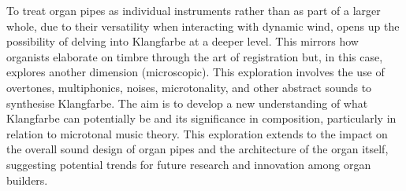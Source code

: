 \documentclass[11pt, oneside]{article}   	%
\begin{document}
To treat organ pipes as individual instruments rather than as part of a larger whole, due to their versatility when interacting with dynamic wind, opens up the possibility of delving into Klangfarbe at a deeper level. This mirrors how organists elaborate on timbre through the art of registration but, in this case, explores another dimension (microscopic). This exploration involves the use of overtones, multiphonics, noises, microtonality, and other abstract sounds to synthesise Klangfarbe. The aim is to develop a new understanding of what Klangfarbe can potentially be and its significance in composition, particularly in relation to microtonal music theory. This exploration extends to the impact on the overall sound design of organ pipes and the architecture of the organ itself, suggesting potential trends for future research and innovation among organ builders.
\end{document}
